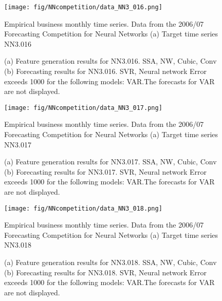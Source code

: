 \documentclass[12pt]{article}
\begin{document}
\begin{figure}
\centering
\texttt{[image: fig/NNcompetition/data\_NN3\_016.png]}
\caption{Empirical business monthly time series. Data from the 2006/07 Forecasting Competition for Neural Networks	(a) Target time series	NN3.016	}
\end{figure}


\begin{figure}
\centering
{}
\caption{(a)	Feature generation results for	NN3.016.	SSA, NW, Cubic, Conv	(b)	Forecasting results for	NN3.016.	SVR, Neural network	Error exceeds 1000 for the following models: VAR.The forecasts for VAR are not displayed.	}
\end{figure}


\begin{figure}
\centering
\texttt{[image: fig/NNcompetition/data\_NN3\_017.png]}
\caption{Empirical business monthly time series. Data from the 2006/07 Forecasting Competition for Neural Networks	(a) Target time series	NN3.017	}
\end{figure}


\begin{figure}
\centering
{}
\caption{(a)	Feature generation results for	NN3.017.	SSA, NW, Cubic, Conv	(b)	Forecasting results for	NN3.017.	SVR, Neural network	Error exceeds 1000 for the following models: VAR.The forecasts for VAR are not displayed.	}
\end{figure}


\begin{figure}
\centering
\texttt{[image: fig/NNcompetition/data\_NN3\_018.png]}
\caption{Empirical business monthly time series. Data from the 2006/07 Forecasting Competition for Neural Networks	(a) Target time series	NN3.018	}
\end{figure}


\begin{figure}
\centering
{}
\caption{(a)	Feature generation results for	NN3.018.	SSA, NW, Cubic, Conv	(b)	Forecasting results for	NN3.018.	SVR, Neural network	Error exceeds 1000 for the following models: VAR.The forecasts for VAR are not displayed.	}
\end{figure}
\end{document}
